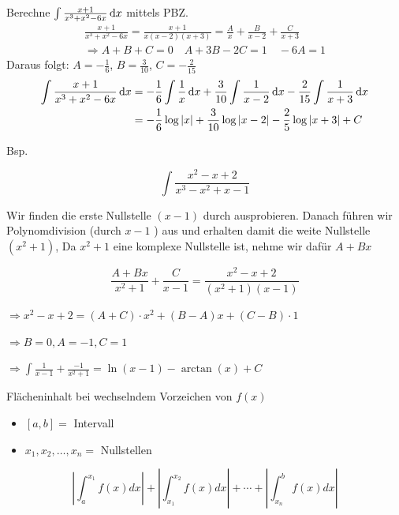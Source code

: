 \begin{example}
	Berechne $\int \frac{x+1}{x^3 + x^2 - 6x} \dif x$ mittels PBZ.
	\begin{gather*}
		\frac{x+1}{x^3 + x^2 - 6x} = \frac{x+1}{x(x-2)(x+3)} = \frac{A}{x} + \frac{B}{x-2} + \frac{C}{x+3}\\
		\Rightarrow A + B + C = 0 \quad A + 3B - 2C = 1 \quad -6A = 1
	\end{gather*}
	Daraus folgt: $A = -\frac{1}{6}$, $B = \frac{3}{10}$, $C = -\frac{2}{15}$
	\begin{align*}
		\int \frac{x+1}{x^3 + x^2 - 6x} \dif x &= -\frac{1}{6} \int \frac{1}{x} \dif x + \frac{3}{10} \int \frac{1}{x-2} \dif x - \frac{2}{15} \int \frac{1}{x+3} \dif x\\
						       &= -\frac{1}{6} \log |x| + \frac{3}{10} \log |x-2| - \frac{2}{5} \log |x+3| + C 
	\end{align*}
\end{example}


\begin{example}
    Bsp.

$$
\int \frac{x^{2}-x+2}{x^{3}-x^{2}+x-1}
$$

Wir finden die erste Nullstelle $(x-1)$ durch ausprobieren. Danach führen wir Polynomdivision (durch $x-1$ ) aus und erhalten damit die weite Nullstelle $\left(x^{2}+1\right)$, Da $x^{2}+1$ eine komplexe Nullstelle ist, nehme wir dafür $A+B x$

$$
\frac{A+B x}{x^{2}+1}+\frac{C}{x-1}=\frac{x^{2}-x+2}{\left(x^{2}+1\right)(x-1)}
$$

$\Longrightarrow x^{2}-x+2=(A+C) \cdot x^{2}+(B-A) x+(C-B) \cdot 1$

$\Longrightarrow B=0, A=-1, C=1$

$\Longrightarrow \int \frac{1}{x-1}+\frac{-1}{x^{2}+1}=\ln (x-1)-\arctan (x)+C$
\end{example}




\begin{KR}{Flächeninhalt bei wechselndem Vorzeichen von $f(x)$}\\
	\begin{itemize}
	  \item $[a, b]=$ Intervall
	  \item $x_{1}, x_{2}, \ldots, x_{n}=$ Nullstellen
	\end{itemize}
	
	$$\left|\int_{a}^{x_{1}} f(x) d x\right|+\left|\int_{x_{1}}^{x_{2}} f(x) d x\right|+\cdots+\left|\int_{x_{n}}^{b} f(x) d x\right|$$
	\end{KR}


